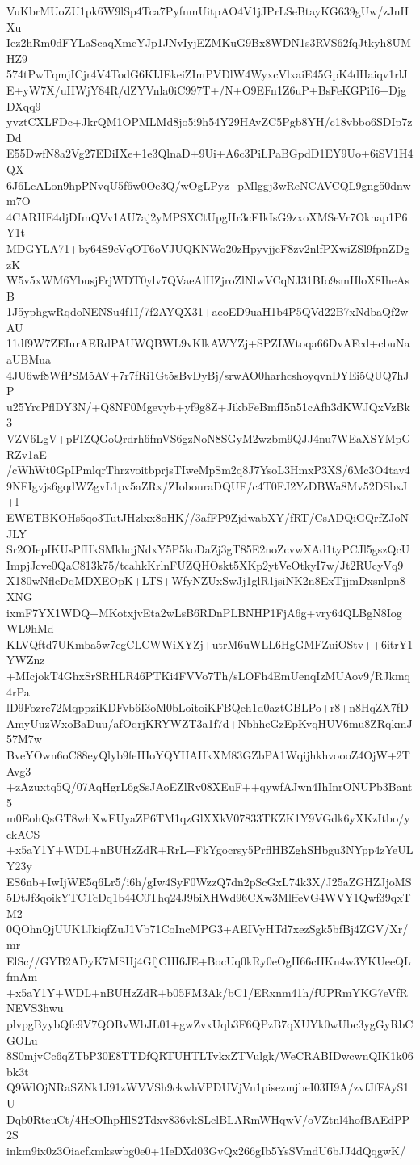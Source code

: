 VuKbrMUoZU1pk6W9lSp4Tca7PyfnmUitpAO4V1jJPrLSeBtayKG639gUw/zJnHXu
Iez2hRm0dFYLaScaqXmcYJp1JNvIyjEZMKuG9Bx8WDN1s3RVS62fqJtkyh8UMHZ9
574tPwTqmjICjr4V4TodG6KIJEkeiZImPVDlW4WyxcVlxaiE45GpK4dHaiqv1rlJ
E+yW7X/uHWjY84R/dZYVnla0iC997T+/N+O9EFn1Z6uP+BsFeKGPiI6+DjgDXqq9
yvztCXLFDc+JkrQM1OPMLMd8jo5i9h54Y29HAvZC5Pgb8YH/c18vbbo6SDIp7zDd
E55DwfN8a2Vg27EDiIXe+1e3QlnaD+9Ui+A6c3PiLPaBGpdD1EY9Uo+6iSV1H4QX
6J6LcALon9hpPNvqU5f6w0Oe3Q/wOgLPyz+pMlggj3wReNCAVCQL9gng50dnwm7O
4CARHE4djDImQVv1AU7aj2yMPSXCtUpgHr3cEIkIsG9zxoXMSeVr7Oknap1P6Y1t
MDGYLA71+by64S9eVqOT6oVJUQKNWo20zHpyvjjeF8zv2nlfPXwiZSl9fpnZDgzK
W5v5xWM6YbusjFrjWDT0ylv7QVaeAlHZjroZlNlwVCqNJ31BIo9smHloX8IheAsB
1J5yphgwRqdoNENSu4f1I/7f2AYQX31+aeoED9uaH1b4P5QVd22B7xNdbaQf2wAU
11df9W7ZEIurAERdPAUWQBWL9vKlkAWYZj+SPZLWtoqa66DvAFcd+cbuNaaUBMua
4JU6wf8WfPSM5AV+7r7fRi1Gt5sBvDyBj/srwAO0harhcshoyqvnDYEi5QUQ7hJP
u25YrcPflDY3N/+Q8NF0Mgevyb+yf9g8Z+JikbFeBmfI5n51cAfh3dKWJQxVzBk3
VZV6LgV+pFIZQGoQrdrh6fmVS6gzNoN8SGyM2wzbm9QJJ4nu7WEaXSYMpGRZv1aE
/cWhWt0GpIPmlqrThrzvoitbprjsTIweMpSm2q8J7YsoL3HmxP3XS/6Mc3O4tav4
9NFIgvjs6gqdWZgvL1pv5aZRx/ZIobouraDQUF/c4T0FJ2YzDBWa8Mv52DSbxJ+l
EWETBKOHs5qo3TutJHzlxx8oHK//3afFP9ZjdwabXY/fRT/CsADQiGQrfZJoNJLY
Sr2OIepIKUsPfHkSMkhqjNdxY5P5koDaZj3gT85E2noZcvwXAd1tyPCJl5gszQcU
ImpjJcve0QaC813k75/tcahkKrlnFUZQHOskt5XKp2ytVeOtkyI7w/Jt2RUcyVq9
X180wNfleDqMDXEOpK+LTS+WfyNZUxSwJj1glR1jsiNK2n8ExTjjmDxsnlpn8XNG
ixmF7YX1WDQ+MKotxjvEta2wLsB6RDnPLBNHP1FjA6g+vry64QLBgN8IogWL9hMd
KLVQftd7UKmba5w7egCLCWWiXYZj+utrM6uWLL6HgGMFZuiOStv++6itrY1YWZnz
+MIcjokT4GhxSrSRHLR46PTKi4FVVo7Th/sLOFh4EmUenqIzMUAov9/RJkmq4rPa
lD9Fozre72MqppziKDFvb6I3oM0bLoitoiKFBQeh1d0aztGBLPo+r8+n8HqZX7fD
AmyUuzWxoBaDuu/afOqrjKRYWZT3a1f7d+NbhheGzEpKvqHUV6mu8ZRqkmJ57M7w
BveYOwn6oC88eyQlyb9feIHoYQYHAHkXM83GZbPA1WqijhkhvoooZ4OjW+2TAvg3
+zAzuxtq5Q/07AqHgrL6gSsJAoEZlRv08XEuF++qywfAJwn4IhInrONUPb3Bant5
m0EohQsGT8whXwEUyaZP6TM1qzGlXXkV07833TKZK1Y9VGdk6yXKzItbo/yckACS
+x5aY1Y+WDL+nBUHzZdR+RrL+FkYgocrsy5PrflHBZghSHbgu3NYpp4zYeULY23y
ES6nb+IwIjWE5q6Lr5/i6h/gIw4SyF0WzzQ7dn2pScGxL74k3X/J25aZGHZJjoMS
5DtJf3qoikYTCTcDq1b44C0Thq24J9biXHWd96CXw3MlffeVG4WVY1Qwf39qxTM2
0QOhnQjUUK1JkiqfZuJ1Vb71CoIncMPG3+AEIVyHTd7xezSgk5bfBj4ZGV/Xr/mr
ElSc//GYB2ADyK7MSHj4GfjCHI6JE+BocUq0kRy0eOgH66cHKn4w3YKUeeQLfmAm
+x5aY1Y+WDL+nBUHzZdR+b05FM3Ak/bC1/ERxnm41h/fUPRmYKG7eVfRNEVS3hwu
plvpgByybQfc9V7QOBvWbJL01+gwZvxUqb3F6QPzB7qXUYk0wUbc3ygGyRbCGOLu
8S0mjvCc6qZTbP30E8TTDfQRTUHTLTvkxZTVulgk/WeCRABIDwcwnQIK1k06bk3t
Q9WlOjNRaSZNk1J91zWVVSh9ckwhVPDUVjVn1pisezmjbeI03H9A/zvfJfFAyS1U
Dqb0RteuCt/4HeOIhpHlS2Tdxv836vkSLclBLARmWHqwV/oVZtnl4hofBAEdPP2S
inkm9ix0z3Oiacfkmkswbg0e0+1IeDXd03GvQx266gIb5YsSVmdU6bJJ4dQqgwK/
